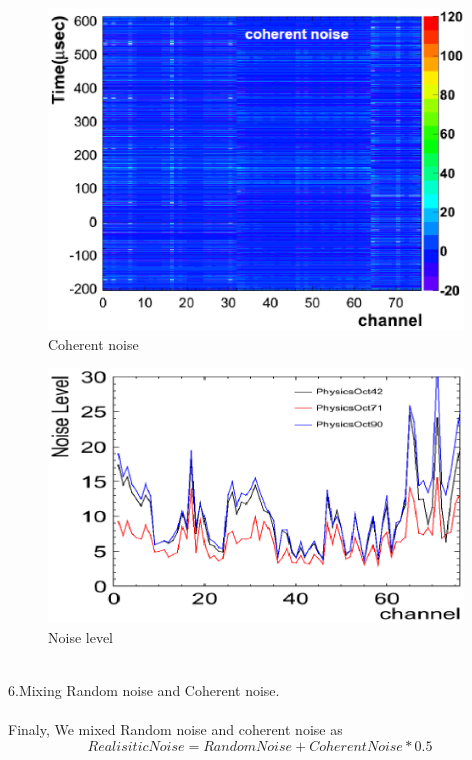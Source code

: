 \begin{figure}[!htb]
  \centering
  \centering
  \includegraphics[width=11cm,clip]{./fig/coherentNoise.eps}
  \caption{Coherent noise}
  \label{coherentNoise}
\end{figure}
\begin{figure}[!htb]
  \centering
  \centering
  \includegraphics[width=11cm,clip]{./fig/scaling.eps}
  \caption{Noise level}
  \label{scaling}
\end{figure}
\\
6.Mixing Random noise and Coherent noise.\\
\\
Finaly, We mixed Random noise and coherent noise as \\
\begin{equation}
  RealisiticNoise = RandomNoise + CoherentNoise*0.5
\end{equation}
